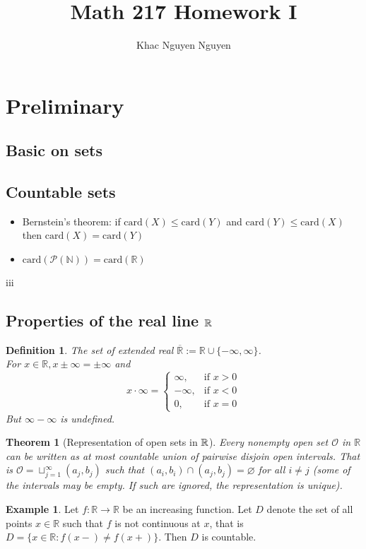 \documentclass[11pt]{article}
\title{\textbf{Math 217 Homework I}}
\author{Khac Nguyen Nguyen}
\date{}
\newtheorem{definition}{Definition}[section]
\theoremstyle{mystyle}
\newtheorem{theorem}{Theorem}[section]
\theoremstyle{definition}
\newtheorem*{exmp}{Example}
\begin{document}
\section{Preliminary}
\subsection{Basic on sets}
\subsection{Countable sets}
\begin{itemize}
  \item Bernstein's theorem: if $\text{card}(X) \le \text{card}(Y)$ and $\text{card}(Y) \le \text{card}(X)$ then $\text{card}(X) = \text{card}(Y)$
  \item $\text{card}(\mathcal{P}(\mathbb{N})) = \text{card}(\mathbb{R})$
\end{itemize}
iii
\subsection{Properties of the real line $\protect\mathbb{R}$}
\begin{definition}
  The set of extended real $\overline{\mathbb{R}}:=  \mathbb{R} \cup \{-\infty, \infty\}$. \\
  For $x \in \mathbb{R}, x \pm \infty = \pm \infty$ and 
  \begin{displaymath}
    x \cdot \infty = 
    \begin{cases}
      \infty, & \text{if } x > 0 \\ 
      -\infty, & \text{if } x < 0 \\
      0, & \text{if } x = 0
    \end{cases}
  \end{displaymath} 
    But $\infty - \infty$ is undefined.
\end{definition}
\begin{theorem}[Representation of open sets in $\protect\mathbb{R}$]
  Every nonempty open set $\mathcal{O}$ in $\mathbb{R}$ can be written as at most countable union of pairwise disjoin open intervals. That is $\mathcal{O} = \sqcup_{j=1}^\infty (a_j, b_j)$ such that $(a_i, b_i) \cap (a_j, b_j) = \varnothing$ for all $i \ne j$ (some of the intervals may be empty. If such are ignored, the representation is unique).
\end{theorem}
\begin{exmp}
  Let $f: \mathbb{R} \to \mathbb{R}$ be an increasing function. Let $D$ denote the set of all points $x \in \mathbb{R}$ such that $f$ is not continuous at $x$, that is $D = \{x \in \mathbb{R}: f(x-) \ne f(x+)\}$. Then $D$ is countable.
\end{exmp}
\end{document}
